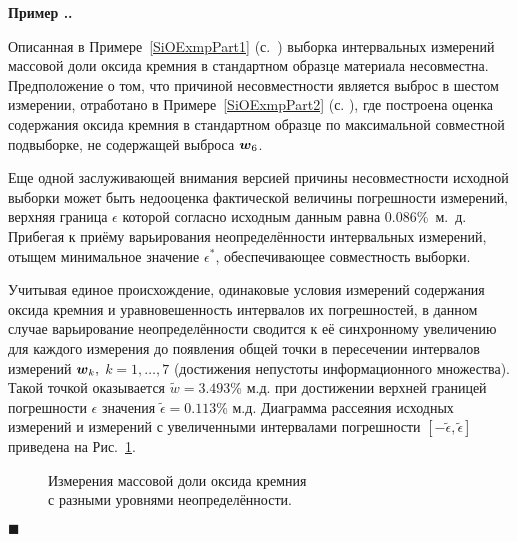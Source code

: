 \documentclass[a5paper,openany]{book}
\newcommand{\mbf}[1]{\protect\text{\boldmath$#1$}}
\newcounter{ExmpNum}[section]
\renewcommand{\theExmpNum}{\thesection.\arabic{ExmpNum}}
\newenvironment{example}%
  {\refstepcounter{ExmpNum}%
  \par\addvspace{\medskipamount} 
  \noindent\textbf{Пример {\theExmpNum}.}
  }%
  {\hfill$\blacksquare$\par\medskip}
\begin{document}
\begin{example} 
\label{SiOExmpPart3} 
Описанная в Примере~\ref{SiOExmpPart1} (с.~\pageref{SiOExmpPart1}) выборка интервальных 
измерений массовой доли оксида кремния в стандартном образце материала несовместна. 
Предположение о том, что причиной несовместности является выброс в шестом измерении, 
отработано в Примере~\ref{SiOExmpPart2} (с. \pageref{SiOExmpPart2}), где построена 
оценка содержания оксида кремния в стандартном образце по максимальной совместной 
подвыборке, не содержащей выброса $\mbf{w}_6$. 

Еще одной заслуживающей внимания версией причины несовместности исходной выборки 
может быть недооценка фактической величины погрешности измерений, верхняя граница  
$\epsilon$ которой  согласно исходным данным равна $0.086\%$~м.~д. Прибегая к приёму
варьирования неопределённости интервальных измерений, отыщем минимальное значение 
$\epsilon^{*}$, обеспечивающее совместность выборки.

Учитывая единое происхождение, одинаковые условия измерений содержания оксида 
кремния и уравновешенность интервалов их погрешностей, в данном случае варьирование 
неопределённости сводится к её синхронному увеличению для каждого измерения 
до появления общей точки в пересечении интервалов измерений 
$\mbf{w}_k,$ $k = 1, \dots, 7$ (достижения непустоты информационного множества). 
Такой точкой оказывается $\tilde{w} = 3.493$\% м.д. при достижении верхней границей 
погрешности $\epsilon$ значения $\tilde{\epsilon} = 0.113$\% м.д. Диаграмма рассеяния 
исходных измерений и измерений с увеличенными интервалами погрешности 
$[-\tilde{\epsilon}, \tilde{\epsilon}]$ приведена на Рис.~\ref{SiOVarUncertPic}.


     
\begin{figure}[!htb]
\centering 

\caption{Измерения массовой доли оксида кремния\\ с разными уровнями неопределённости.}
\label{SiOVarUncertPic}
\end{figure}


\end{example}
\end{document}
